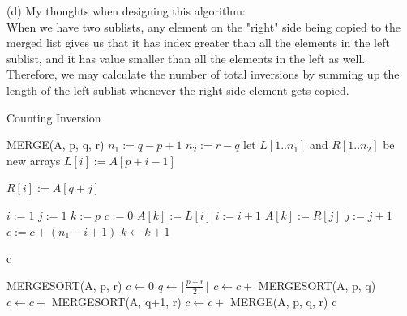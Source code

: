 \documentclass[14pt]{article}
\begin{document}
\noindent(d)
My thoughts when designing this algorithm: \\
When we have two sublists, any element on the "right" side being copied to the merged list gives us that it has index greater than all the elements in the left sublist, and it has value smaller than all the elements in the left as well. Therefore, we may calculate the number of total inversions by summing up the length of the left sublist whenever the right-side element gets copied. 

\begin{algorithm}
\caption{Counting Inversion}
\begin{algorithmic}[1]
	\Statex MERGE(A, p, q, r)
	\State $n_1 := q - p + 1$
	\State $n_2 := r - q$
	\State let $L[1..n_1]$ and $R[1..n_2]$ be new arrays
		\State $L[i] := A[p + i - 1]$
	\EndFor

		\State $R[i] := A[q + j]$
	\EndFor
	
	\State $i := 1$
	\State $j := 1$
	\State $k := p$
	\State $c := 0$ 
			\State $A[k] := L[i]$
			\State $i := i + 1$
		\Else
			\State $A[k] := R[j]$
			\State $j := j + 1$
			\State $c := c + (n_1 - i + 1)$
		\EndIf
		\State $k \gets k + 1$
	\EndWhile
	
	\State \Return c
\end{algorithmic}
\end{algorithm}

\pagebreak
\begin{algorithm}
\begin{algorithmic}[1]
	\Statex MERGESORT(A, p, r)
	\State $c \gets 0$
			\State $q \gets \lfloor \frac{p + r}{2} \rfloor$
			\State $c \gets c + $ MERGESORT(A, p, q)
			\State $c \gets c + $ MERGESORT(A, q+1, r)
			\State $c \gets c + $ MERGE(A, p, q, r)
			\State \Return c
		\EndIf
		\State {}
	\State
	
\end{algorithmic}
\end{algorithm}

\pagebreak
\end{document}
